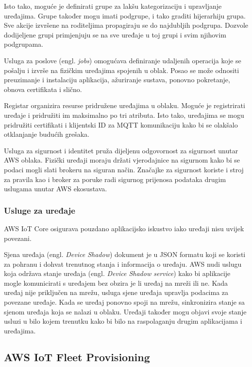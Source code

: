 Isto tako, moguće je definirati grupe za lakšu kategorizaciju i upravljanje uređajima. Grupe također mogu imati podgrupe, i tako graditi hijerarhiju grupa. Sve akcije izvršene na roditeljima propagiraju se do najdubljih podgrupa. Dozvole dodijeljene grupi primjenjuju se na sve uređaje u toj grupi i svim njihovim podgrupama. 

Usluga za poslove (engl. \textit{jobs}) omogućava definiranje udaljenih operacija koje se pošalju i izvrše na fizičkim uređajima spojenih u oblak. Posao se može odnositi preuzimanje i instalaciju aplikacija, ažuriranje sustava, ponovno pokretanje, obnova certifikata i slično.

Registar organizira resurse pridružene uređajima u oblaku. Moguće je registrirati uređaje i pridružiti im maksimalno po tri atributa. Isto tako, uređajima se mogu pridružiti certifikati i klijentski ID za MQTT komunikaciju kako bi se olakšalo otklanjanje budućih grešaka.

Usluga za sigurnost i identitet pruža dijeljenu odgovornost za sigurnost unutar AWS oblaka. Fizički uređaji moraju držati vjerodajnice na sigurnom kako bi se podaci mogli slati brokeru na siguran način. Značajke za sigurnost koriste i stroj za pravila kao i broker za poruke radi sigurnog prijenosa podataka drugim uslugama unutar AWS ekosustava.

\subsubsection{Usluge za uređaje}

AWS IoT Core osigurava pouzdano aplikacijsko iskustvo iako uređaji nisu uvijek povezani. 

Sjena uređaja (engl. \textit{Device Shadow}) dokument je u JSON formatu koji se koristi za pohranu i dohvat trenutnog stanja i informacija o uređaju. AWS nudi uslugu koja održava stanje uređaja (engl. \textit{Device Shadow service}) kako bi aplikacije mogle komunicirati s uređajem bez obzira je li uređaj na mreži ili ne. Kada uređaj nije priključen na mrežu, usluga sjene uređaja upravlja podacima za povezane uređaje. Kada se uređaj ponovno spoji na mrežu, sinkronizira stanje sa sjenom uređaja koja se nalazi u oblaku. Uređaji također mogu objavi svoje stanje usluzi u bilo kojem trenutku kako bi bilo na raspolaganju drugim aplikacijama i uređajima. 

\subsection{AWS IoT Fleet Provisioning}



